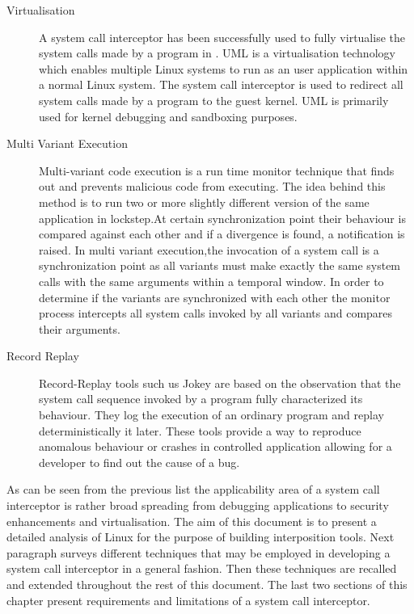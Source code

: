 \begin{description}
\item[Virtualisation] 
A system call interceptor has been successfully used to fully virtualise the system calls made by a program in \cite{UML_1,goanna, UML_2}. UML is a virtualisation technology which enables multiple Linux systems to run as an user application within a normal Linux system. The system call interceptor is used to redirect all system calls made by a program to the guest kernel. UML is primarily used for kernel debugging and sandboxing purposes. 

\item[Multi Variant Execution]
Multi-variant code execution \cite{orchestra, mvupdates:hotswup12}  is a run time monitor technique that finds out and prevents malicious code from executing. The idea behind this method is to run two or more slightly different version of the same application in lockstep.At certain synchronization point their behaviour is compared against each other and if a divergence is found, a notification is raised. In multi variant execution,the invocation of a system call is a synchronization point as all variants must make exactly the same system calls with the same arguments within a temporal window.  In order to determine if the variants are synchronized with each other the monitor process intercepts all system calls invoked by all variants and compares their arguments. 

\item[Record Replay]
Record-Replay tools such us Jokey \cite{Saito05jockey:a} are based on the observation that the system call sequence invoked by a program fully characterized its behaviour. They log the execution of an ordinary program and replay deterministically it later. These tools provide a way to reproduce anomalous behaviour or crashes in controlled application  allowing for a developer to find out the cause of a bug. 
  
\end{description}

As can be seen from the previous list the applicability area of a system call interceptor is rather broad spreading from debugging applications  to security enhancements and virtualisation. The aim of this document is to present a  detailed analysis of Linux for the purpose of building interposition tools. Next paragraph surveys different techniques that may be employed in developing a system call interceptor in a general fashion. Then these techniques are recalled and extended throughout the rest of this document. The last two sections of this chapter present requirements and limitations of a system call interceptor.  


